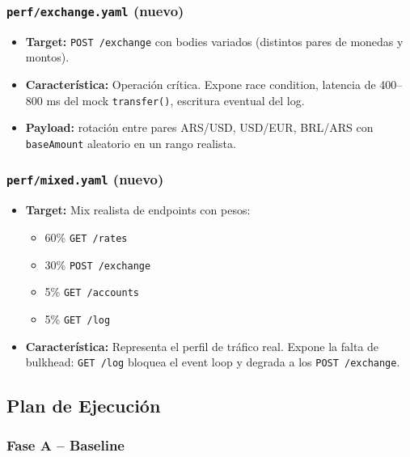 \subsubsection{\texttt{perf/exchange.yaml} (nuevo)}

\begin{itemize}[leftmargin=*]
    \item \textbf{Target:} \texttt{POST /exchange} con bodies variados (distintos pares de monedas y montos).
    \item \textbf{Característica:} Operación crítica. Expone race condition, latencia de 400–800 ms del mock \texttt{transfer()}, escritura eventual del log.
    \item \textbf{Payload:} rotación entre pares ARS/USD, USD/EUR, BRL/ARS con \texttt{baseAmount} aleatorio en un rango realista.
\end{itemize}

\subsubsection{\texttt{perf/mixed.yaml} (nuevo)}

\begin{itemize}[leftmargin=*]
    \item \textbf{Target:} Mix realista de endpoints con pesos:
    \begin{itemize}
        \item 60\% \texttt{GET /rates}
        \item 30\% \texttt{POST /exchange}
        \item 5\% \texttt{GET /accounts}
        \item 5\% \texttt{GET /log}
    \end{itemize}
    \item \textbf{Característica:} Representa el perfil de tráfico real. Expone la falta de bulkhead: \texttt{GET /log} bloquea el event loop y degrada a los \texttt{POST /exchange}.
\end{itemize}

\subsection{Plan de Ejecución}

\subsubsection{Fase A -- Baseline}


